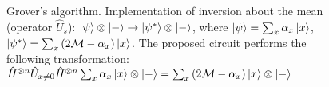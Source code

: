 \begin{figure}
\centering



\caption{Grover's algorithm. Implementation of inversion about the mean (operator $\hat{U}_s$): $\left|\psi\right>\otimes\ket{-} \rightarrow
  \left|\psi^{\ast}\right>\otimes\ket{-}$, where
$\left|\psi\right> = \sum_x \alpha_x \ket{ x }$, 
$\left|\psi^{\ast}\right> = \sum_x \left( 2 \mathcal{M} -  \alpha_x \right)
  \ket{ x }$. 
The proposed circuit performs the following transformation: 
$\hat{H}^{\otimes n}\hat{U}_{x \ne 0}\hat{H}^{\otimes n} \sum_x
  \alpha_x \ket{ x } \otimes \left| - \right > = 
\sum_x \left( 2 \mathcal{M} -  \alpha_x \right) \ket{ x }
\otimes \left| - \right >
$
} 
\label{figQuantCompGroverMeanInvImpl}
\end{figure}